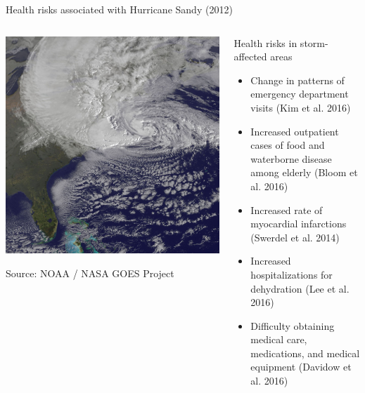 \documentclass[ignorenonframetext,]{beamer}
\begin{document}
\begin{frame}{Health risks associated with Hurricane Sandy (2012)}

\begin{columns}

\begin{column}{0.45\textwidth}

\begin{center}\includegraphics[width=\textwidth]{sandy_satellite} \end{center}
\vspace{-0.5cm}
\begin{center}
\scriptsize Source: NOAA / NASA GOES Project
\end{center}
\end{column}

\begin{column}{0.55\textwidth}
\small
\begin{block}{Health risks in storm-affected areas}
\begin{itemize}
  \item Change in patterns of emergency department visits (Kim et al. 2016)
  \item Increased outpatient cases of food and waterborne disease among elderly (Bloom et al. 2016)
  \item Increased rate of myocardial infarctions (Swerdel et al. 2014)
  \item Increased hospitalizations for dehydration (Lee et al. 2016)
  \item Difficulty obtaining medical care, medications, and medical equipment (Davidow et al. 2016)
\end{itemize}
\end{block}
\end{column}

\end{columns}

\end{frame}
\end{document}
